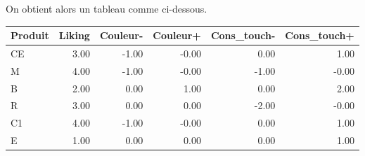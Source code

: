 \documentclass[aspectratio=169,xcolor=dvipsnames]{beamer}
\begin{document}
\begin{frame}
\textcolor{nyubluedarker}{\faCogs} On obtient alors un tableau comme ci-dessous.

\begin{tiny}
\begin{center}
	\begin{tabular}{lrrrrr}
  \hline
Produit & Liking & Couleur- & Couleur+ & Cons\_touch- & Cons\_touch+ \\ 
  \hline
CE & 3.00 & -1.00 & -0.00 & 0.00 & 1.00 \\ 
M & 4.00 & -1.00 & -0.00 & -1.00 & -0.00 \\ 
B & 2.00 & 0.00 & 1.00 & 0.00 & 2.00 \\ 
R & 3.00 & 0.00 & 0.00 & -2.00 & -0.00 \\ 
C1 & 4.00 & -1.00 & -0.00 & 0.00 & 1.00 \\ 
E & 1.00 & 0.00 & 0.00 & 0.00 & 1.00 \\ 
   \hline
	\end{tabular}
\end{center}
\end{tiny}


\end{frame}
\end{document}
